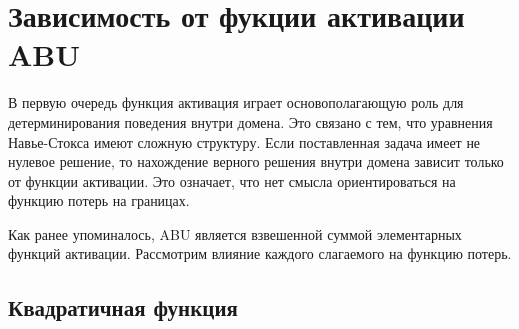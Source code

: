 \section{Зависимость от фукции активации ABU}

В первую очередь функция активация играет основополагающую роль для
детерминирования поведения внутри домена. Это связано с тем, что
уравнения Навье-Стокса имеют сложную структуру. Если поставленная
задача имеет не нулевое решение, то нахождение верного решения внутри
домена зависит только от функции активации. Это означает, что нет смысла
ориентироваться на функцию потерь на границах.

Как ранее упоминалось, ABU является взвешенной суммой элементарных функций
активации. Рассмотрим влияние каждого слагаемого на функцию потерь.
\subsection{Квадратичная функция}
